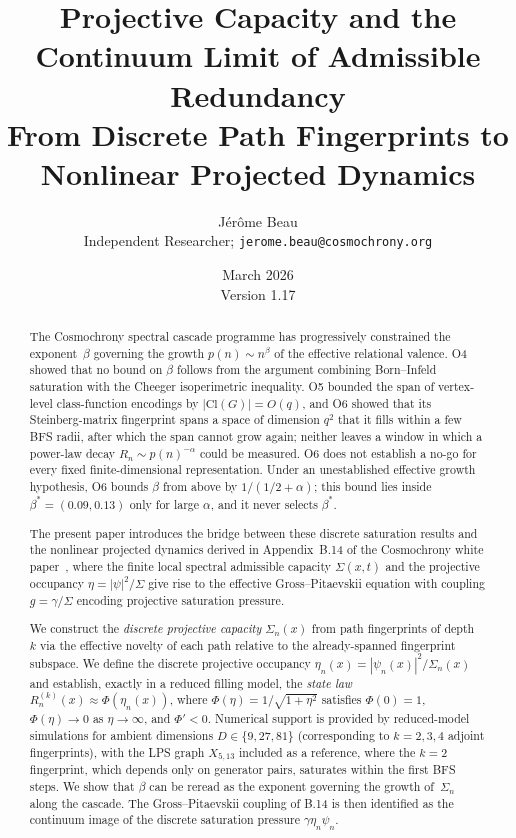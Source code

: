 \documentclass[11pt,a4paper]{article}
\title{%
  \textbf{Projective Capacity and the Continuum Limit of Admissible Redundancy}\\[0.4em]
  \large From Discrete Path Fingerprints to Nonlinear Projected Dynamics
}
\author{%
  J\'{e}r\^{o}me Beau\\[0.3em]
  \small Independent Researcher; \texttt{jerome.beau@cosmochrony.org}
}
\date{March 2026\\[2pt]\small Version 1.17}
\theoremstyle{definition}
\theoremstyle{remark}
\begin{document}
  \maketitle

  \begin{abstract}
    The Cosmochrony spectral cascade programme has progressively constrained the exponent~$\beta$
    governing the growth $p(n) \sim n^\beta$ of the effective relational valence.
    O4 showed that no bound on $\beta$ follows from the argument combining Born--Infeld saturation
    with the Cheeger isoperimetric inequality.
    O5 bounded the span of vertex-level class-function encodings by $|\mathrm{Cl}(G)| = O(q)$, and
    O6 showed that its Steinberg-matrix fingerprint spans a space of dimension $q^2$ that it fills
    within a few BFS radii, after which the span cannot grow again; neither leaves a window in which a
    power-law decay $R_n \sim p(n)^{-\alpha}$ could be measured.
    O6 does not establish a no-go for every fixed finite-dimensional representation.
    Under an unestablished effective growth hypothesis, O6 bounds $\beta$ from above by
    $1/(1/2+\alpha)$; this bound lies inside $\beta^* = (0.09, 0.13)$ only for large $\alpha$, and it
    never selects $\beta^*$.

    The present paper introduces the bridge between these discrete saturation results and the nonlinear
    projected dynamics derived in Appendix~B.14 of the Cosmochrony white paper~\cite{Cosmochrony},
    where the finite local spectral admissible capacity $\Sigma(x,t)$ and the projective
    occupancy $\eta = |\psi|^2/\Sigma$ give rise to the effective Gross--Pitaevskii equation
    with coupling $g = \gamma/\Sigma$ encoding projective saturation pressure.

    We construct the \emph{discrete projective capacity} $\Sigma_n(x)$ from path fingerprints
    of depth~$k$ via the effective novelty of each path relative to the already-spanned
    fingerprint subspace.
    We define the discrete projective occupancy $\eta_n(x) = |\psi_n(x)|^2/\Sigma_n(x)$ and
    establish, exactly in a reduced filling model, the \emph{state law}
    $R_n^{(k)}(x) \approx \Phi(\eta_n(x))$,
    where $\Phi(\eta) = 1/\sqrt{1+\eta^2}$ satisfies $\Phi(0)=1$, $\Phi(\eta)\to 0$ as
    $\eta \to \infty$, and $\Phi' < 0$.
    Numerical support is provided by reduced-model simulations for ambient dimensions
    $D \in \{9,27,81\}$ (corresponding to $k=2,3,4$ adjoint fingerprints), with the LPS graph
    $X_{5,13}$ included as a reference, where the $k=2$ fingerprint, which depends only on generator
    pairs, saturates within the first BFS steps.
    We show that $\beta$ can be reread as the exponent governing the growth of~$\Sigma_n$ along the cascade.
    The Gross--Pitaevskii coupling of B.14 is then identified as the continuum image of the
    discrete saturation pressure $\gamma\eta_n\psi_n$.


\end{abstract}
\end{document}
